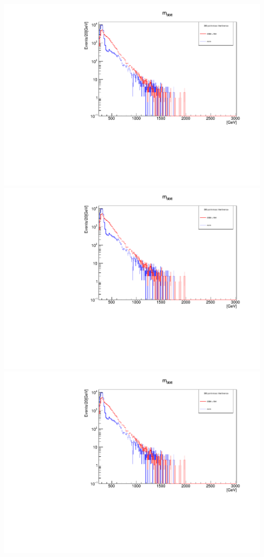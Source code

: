 \documentclass[a4wide,10pt]{article}
\begin{document}
\includegraphics[scale=0.50,page=4]{InterferencePlots15p.pdf}
\includegraphics[scale=0.50,page=5]{InterferencePlots15p.pdf}
\includegraphics[scale=0.50,page=6]{InterferencePlots15p.pdf}
\end{document}
